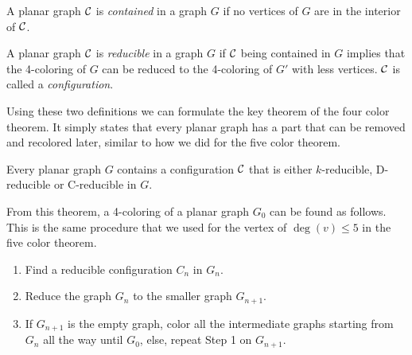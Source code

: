 \begin{definition}
    A planar graph $\mathcal{C}$ is \emph{contained} in a graph $G$ if no vertices of $G$ are in the interior of $\mathcal{C}$.
\end{definition}

\begin{definition}
    A planar graph $\mathcal{C}$ is \emph{reducible} in a graph $G$ if $\mathcal{C}$ being contained in $G$ implies that the 4-coloring of $G$ can be reduced to the 4-coloring of $G'$ with less vertices. $\mathcal{C}$ is called a \emph{configuration}.
\end{definition}

Using these two definitions we can formulate the key theorem of the four color theorem. It simply states that every planar graph has a part that can be removed and recolored later, similar to how we did for the five color theorem.

\begin{theorem}
    \label{funda1}
    Every planar graph $G$ contains a configuration $\mathcal{C}$ that is either $k$-reducible, D-reducible or C-reducible in $G$.
\end{theorem}

From this theorem, a 4-coloring of a planar graph $G_0$ can be found as follows. This is the same procedure that we used for the vertex of $\deg(v)\leq 5$ in the five color theorem.

\begin{enumerate}
    \item Find a reducible configuration $C_n$ in $G_n$.
    \item Reduce the graph $G_n$ to the smaller graph $G_{n+1}$.
    \item If $G_{n+1}$ is the empty graph, color all the intermediate graphs starting from $G_n$ all the way until $G_0$, else, repeat Step 1 on $G_{n+1}$.
\end{enumerate}